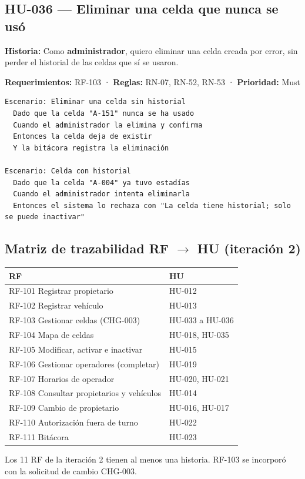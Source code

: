 \subsection{HU-036 — Eliminar una celda que nunca se usó}

\textbf{Historia:} Como \textbf{administrador}, quiero eliminar una celda creada por error, sin perder el historial de las celdas que sí se usaron.


\textbf{Requerimientos:} RF-103 · \textbf{Reglas:} RN-07, RN-52, RN-53 · \textbf{Prioridad:} Must


\begin{lstlisting}[style=gherkin]
Escenario: Eliminar una celda sin historial
  Dado que la celda "A-151" nunca se ha usado
  Cuando el administrador la elimina y confirma
  Entonces la celda deja de existir
  Y la bitácora registra la eliminación

Escenario: Celda con historial
  Dado que la celda "A-004" ya tuvo estadías
  Cuando el administrador intenta eliminarla
  Entonces el sistema lo rechaza con "La celda tiene historial; solo se puede inactivar"
\end{lstlisting}



\subsection{Matriz de trazabilidad RF $\rightarrow$ HU (iteración 2)}

\begin{longtable}{>{\raggedright\arraybackslash}p{11.0cm}>{\raggedright\arraybackslash}p{3.4cm}}
\toprule
\textbf{RF} & \textbf{HU}\\
\midrule\endhead
RF-101 Registrar propietario & HU-012\\
RF-102 Registrar vehículo & HU-013\\
RF-103 Gestionar celdas (CHG-003) & HU-033 a HU-036\\
RF-104 Mapa de celdas & HU-018, HU-035\\
RF-105 Modificar, activar e inactivar & HU-015\\
RF-106 Gestionar operadores (completar) & HU-019\\
RF-107 Horarios de operador & HU-020, HU-021\\
RF-108 Consultar propietarios y vehículos & HU-014\\
RF-109 Cambio de propietario & HU-016, HU-017\\
RF-110 Autorización fuera de turno & HU-022\\
RF-111 Bitácora & HU-023\\
\bottomrule
\end{longtable}


Los 11 RF de la iteración 2 tienen al menos una historia. RF-103 se incorporó con la solicitud de cambio CHG-003.

